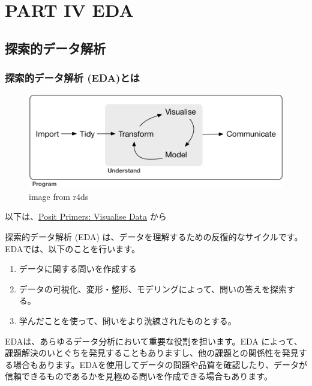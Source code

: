 \documentclass[
  xelatex, ja=standard]{bxjsbook}
\theoremstyle{definition}
\theoremstyle{definition}
\theoremstyle{definition}
\theoremstyle{definition}
\theoremstyle{remark}
\begin{document}
\hypertarget{part-part-iv-eda}{%
\part{PART IV EDA}\label{part-part-iv-eda}}

\hypertarget{intro2eda}{%
\chapter{探索的データ解析}\label{intro2eda}}

\hypertarget{ux63a2ux7d22ux7684ux30c7ux30fcux30bfux89e3ux6790-edaux3068ux306f}{%
\section{探索的データ解析 (EDA)とは}\label{ux63a2ux7d22ux7684ux30c7ux30fcux30bfux89e3ux6790-edaux3068ux306f}}

\begin{figure}
\centering
\includegraphics{./data/data-science.png}
\caption{image from r4ds}
\end{figure}

以下は、\href{https://posit.cloud/learn/primers/3.1}{Posit Primers: Visualise Data} から

探索的データ解析 (EDA) は、データを理解するための反復的なサイクルです。EDAでは、以下のことを行います。

\begin{enumerate}
\def\labelenumi{\arabic{enumi}.}
\item
  データに関する問いを作成する
\item
  データの可視化、変形・整形、モデリングによって、問いの答えを探索する。
\item
  学んだことを使って、問いをより洗練されたものとする。
\end{enumerate}

EDAは、あらゆるデータ分析において重要な役割を担います。EDA によって、課題解決のいとぐちを発見することもありますし、他の課題との関係性を発見する場合もあります。EDAを使用してデータの問題や品質を確認したり、データが信頼できるものであるかを見極める問いを作成できる場合もあります。
\end{document}
